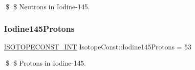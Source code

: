 \$ \$ Neutrons in Iodine-\/145. \mbox{\label{group___isotope_const-_iodine-_i145_gaf9b6429ceabd260cfe07869c8b78bfd1}} 
\subsubsection{\texorpdfstring{Iodine145\+Protons}{Iodine145Protons}}
{\footnotesize\ttfamily \mbox{\hyperlink{group___isotope_const-_macros_ga5f18360b3e99483a35c32d789e62621c}{I\+S\+O\+T\+O\+P\+E\+C\+O\+N\+S\+T\+\_\+\+I\+NT}} Isotope\+Const\+::\+Iodine145\+Protons = 53}

\$ \$ Protons in Iodine-\/145. 